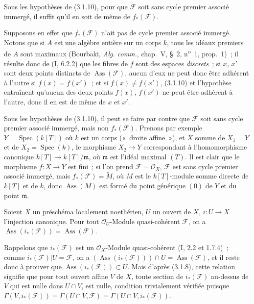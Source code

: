 \begin{corollary}[3.1.11]
\label{IV.2.3.1.11-fr}
Sous les hypothèses de (3.1.10), pour que $\mathcal F$ soit sans cycle premier
associé immergé, il suffit qu'il en soit de même de $f_*(\mathcal F)$.
\end{corollary}

Supposons en effet que $f_*(\mathcal F)$ n'ait pas de cycle premier associé
immergé. Notons que si $A$ est une algèbre entière sur un corps $k$, tous les
idéaux premiers de $A$ sont maximaux (Bourbaki, \emph{Alg. comm.}, chap.~V,
\S~2, n\textsuperscript{o}~1, prop.~1)~; il résulte donc de (I, 6.2.2) que les
fibres de $f$ sont des espaces \emph{discrets}~; si $x$, $x'$ sont deux points
distincts de $\operatorname{Ass}(\mathcal F)$, aucun d'eux ne peut donc être
adhérent à l'autre si $f(x)=f(x')$~; et si $f(x)\ne f(x')$, (3.1.10) et
l'hypothèse entraînent qu'aucun des deux points $f(x)$, $f(x')$ ne peut être
adhérent à l'autre, donc il en est de même de $x$ et $x'$.

\begin{remark}[3.1.12]
\label{IV.2.3.1.12-fr}
Sous les hypothèses de (3.1.10), il peut se faire par contre que $\mathcal F$
soit sans cycle premier associé immergé, mais non $f_*(\mathcal F)$. Prenons
par exemple $Y=\operatorname{Spec}(k[T])$ où $k$ est un corps («~droite
affine~»), et $X$ somme de $X_1=Y$ et de $X_2=\operatorname{Spec}(k)$, le
morphisme $X_2\to Y$ correspondant à l'homomorphisme canonique
$k[T]\to k[T]/\mathfrak m$, où $\mathfrak m$ est l'idéal maximal $(T)$. Il
est clair que le morphisme $f:X\to Y$ est fini~; si l'on prend
$\mathcal F=\mathcal O_X$, $\mathcal F$ est sans cycle premier associé
immergé, mais $f_*(\mathcal F)=\widetilde M$, où $M$ est le $k[T]$-module
somme directe de $k[T]$ et de $k$, donc $\operatorname{Ass}(M)$ est formé du
point générique $(0)$ de $Y$ et du point $\mathfrak m$.
\end{remark}

\begin{proposition}[3.1.13]
\label{IV.2.3.1.13-fr}
Soient $X$ un préschéma localement noethérien, $U$ un ouvert de $X$,
$i:U\to X$ l'injection canonique. Pour tout $\mathcal O_U$-Module
quasi-cohérent $\mathcal F$, on a
$\operatorname{Ass}(i_*(\mathcal F))=\operatorname{Ass}(\mathcal F)$.
\end{proposition}

Rappelons que $i_*(\mathcal F)$ est un $\mathcal O_X$-Module quasi-cohérent
(I, 2.2 et 1.7.4)~; comme $i_*(\mathcal F)|U=\mathcal F$, on a
$(\operatorname{Ass}(i_*(\mathcal F)))\cap U=\operatorname{Ass}(\mathcal F)$,
et il reste donc à prouver que $\operatorname{Ass}(i_*(\mathcal F))\subset U$.
Mais d'après (3.1.8), cette relation signifie que pour tout ouvert affine $V$
de $X$, toute section de $i_*(\mathcal F)$ au-dessus de $V$ qui est nulle
dans $U\cap V$, est nulle, condition trivialement vérifiée puisque
$\Gamma(V,i_*(\mathcal F))=\Gamma(U\cap V,\mathcal F)
=\Gamma(U\cap V,i_*(\mathcal F))$.

